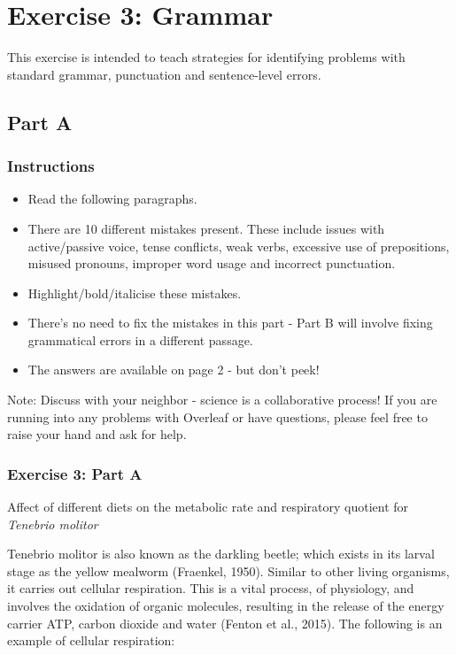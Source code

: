 \documentclass{article}
\begin{document}
\section{Exercise 3: Grammar}

This exercise is intended to teach strategies for identifying problems with standard grammar, punctuation and sentence-level errors. 

\subsection*{Part A}

\subsubsection*{Instructions}

\begin{itemize}
\item Read the following paragraphs.
\item There are 10 different mistakes present. These include issues with active/passive voice, tense conflicts, weak verbs, excessive use of prepositions, misused pronouns, improper word usage and incorrect punctuation. 
\item Highlight/bold/italicise these mistakes.
\item There's no need to fix the mistakes in this part - Part B will involve fixing grammatical errors in a different passage.
\item The answers are available on page 2 - but don't peek! 
\end{itemize}

Note: Discuss with your neighbor - science is a collaborative process! If you are running into any problems with Overleaf or have questions, please feel free to raise your hand and ask for help. 

\subsubsection*{Exercise 3: Part A}

Affect of different diets on the metabolic rate and respiratory quotient for \textit{Tenebrio molitor} 

\par Tenebrio molitor is also known as the darkling beetle; which exists in its larval stage as the yellow mealworm (Fraenkel, 1950). Similar to other living organisms, it carries out cellular respiration. This is a vital process, of physiology, and involves the oxidation of organic molecules, resulting in the release of the energy carrier ATP, carbon dioxide and water (Fenton et al., 2015). The following is an example of cellular respiration: 
\end{document}
